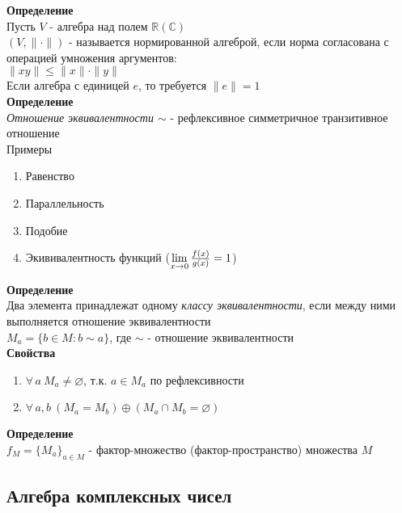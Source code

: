 \documentclass[12pt]{article}
\begin{document}
\textbf{Определение}\\
Пусть $V$ - алгебра над полем $\mathbb{R}(\mathbb{C})$\\
$(V,\|\cdot\|)$ - называется нормированной алгеброй, если норма согласована с операцией умножения аргументов:\\
$\|xy\| \leq \|x\|\cdot\|y\|$\\
Если алгебра с единицей $e$, то требуется $\|e\| = 1$\\
\textbf{Определение}\\
\textit{Отношение эквивалентности $\sim$} - рефлексивное симметричное транзитивное отношение\\
Примеры
\begin{enumerate}
    \item Равенство
    \item Параллельность
    \item Подобие
    \item Экививалентность функций ($\lim\limits_{x\rightarrow 0} \frac{f(x)}{g(x)} = 1$)
\end{enumerate}
\textbf{Определение}\\
Два элемента принадлежат одному \textit{классу эквивалентности}, если между ними выполняется отношение эквивалентности\\
$M_a = \{b\in M: b \sim a\}$, где $\sim$ - отношение эквивалентности\\
\textbf{Свойства}
\begin{enumerate}
    \item $\forall\,a\ M_a \neq \varnothing$, т.к. $a \in M_a$ по рефлексивности
    \item $\forall\,a,b\ (M_a = M_b) \oplus (M_a \cap M_b = \varnothing)$
\end{enumerate}
\textbf{Определение}\\
$f_M=\{M_a\}_{a \in M}$ - фактор-множество (фактор-пространство) множества $M$
\subsection{Алгебра комплексных чисел}
\end{document}

